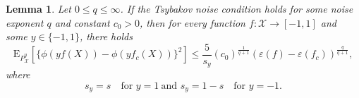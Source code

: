 \documentclass{article}
\newtheorem{lemma}{Lemma}
\begin{document}
\begin{lemma} \label{secondmoment}
Let $0\leq q \leq \infty$. 
If the Tsybakov noise condition holds for some noise exponent $q$ and constant $c_0>0$, then for every function $f: \mathcal{X} \rightarrow [-1,1]$ and some $y \in \{-1,1\}$, there holds 
\begin{equation}
    \mathrm{E}_{P_\mathcal{X}^y}\left[\{\phi(yf(X))-\phi(yf_c(X))\}^2\right] \leq \frac{5}{s_y}(c_0)^{\frac{1}{q+1}} (\varepsilon(f) - \varepsilon(f_c)) ^{\frac{q}{q+1}},
\end{equation}
where \begin{equation}\label{s_y}
    s_y=s \quad \text{for } y=1 \ \text{and } s_y=1-s \quad \text{for } y=-1.
\end{equation}
\end{lemma}
\end{document}
